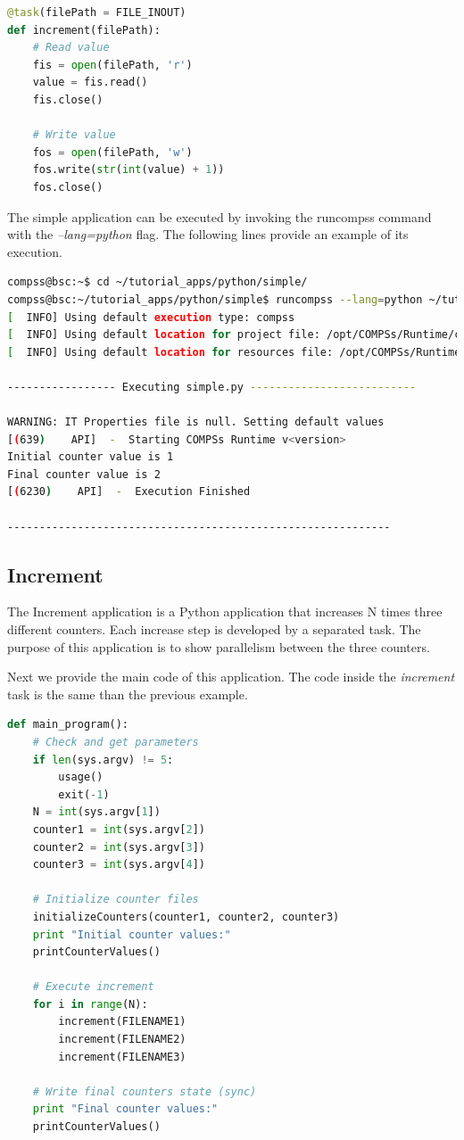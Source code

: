 \begin{lstlisting}[language=python]
@task(filePath = FILE_INOUT)
def increment(filePath):
    # Read value
    fis = open(filePath, 'r')
    value = fis.read()
    fis.close()

    # Write value
    fos = open(filePath, 'w')
    fos.write(str(int(value) + 1))
    fos.close()
\end{lstlisting}

The simple application can be executed by invoking the runcompss command with the \textit{--lang=python} flag. The following lines provide
an example of its execution.

\begin{lstlisting}[language=bash]
compss@bsc:~$ cd ~/tutorial_apps/python/simple/
compss@bsc:~/tutorial_apps/python/simple$ runcompss --lang=python ~/tutorial_apps/python/simple/simple.py 1
[  INFO] Using default execution type: compss
[  INFO] Using default location for project file: /opt/COMPSs/Runtime/configuration/xml/projects/default_project.xml
[  INFO] Using default location for resources file: /opt/COMPSs/Runtime/configuration/xml/resources/default_resources.xml

----------------- Executing simple.py --------------------------

WARNING: IT Properties file is null. Setting default values
[(639)    API]  -  Starting COMPSs Runtime v<version>
Initial counter value is 1
Final counter value is 2
[(6230)    API]  -  Execution Finished

------------------------------------------------------------
\end{lstlisting}

\subsection{Increment}
The Increment application is a Python application that increases N times three different counters. Each increase step is developed by a separated task. The
purpose of this application is to show parallelism between the three counters.

Next we provide the main code of this application. The code inside the \textit{increment} task is the same than the previous example. 

\begin{lstlisting}[language=python]
 def main_program():
    # Check and get parameters
    if len(sys.argv) != 5:
        usage()
        exit(-1)
    N = int(sys.argv[1])
    counter1 = int(sys.argv[2])
    counter2 = int(sys.argv[3])
    counter3 = int(sys.argv[4])

    # Initialize counter files
    initializeCounters(counter1, counter2, counter3)
    print "Initial counter values:"
    printCounterValues()

    # Execute increment
    for i in range(N):
        increment(FILENAME1)
        increment(FILENAME2)
        increment(FILENAME3)

    # Write final counters state (sync)
    print "Final counter values:"
    printCounterValues()
\end{lstlisting}


